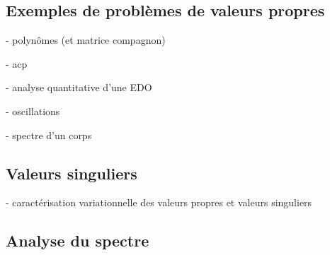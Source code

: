 \subsection{Exemples de problèmes de valeurs propres}

- polynômes (et matrice compagnon)

- acp

- analyse quantitative d'une EDO

- oscillations

- spectre d'un corps

\subsection{Valeurs singuliers}

- caractérisation variationnelle des valeurs propres et valeurs singuliers

\subsection{Analyse du spectre}


%
%
%



